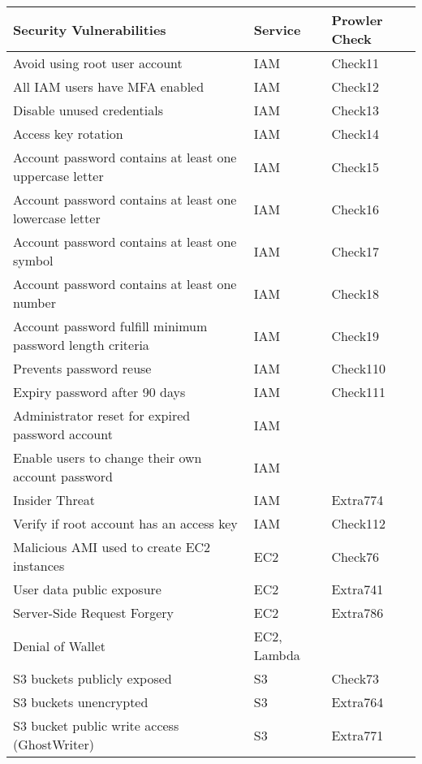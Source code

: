 \begin{longtable}{|p{10cm}|p{2.4cm}|p{2cm}|}
    \hline
    \textbf{Security Vulnerabilities} & \textbf{Service} & \textbf{Prowler Check}\\
    \hline
    Avoid using root user account & IAM & Check11 \\
    \hline
    All IAM users have MFA enabled & IAM & Check12 \\
    \hline
    Disable unused credentials & IAM & Check13 \\
    \hline
    Access key rotation & IAM & Check14 \\
    \hline
    Account password contains at least one uppercase letter & IAM & Check15 \\
    \hline
    Account password contains at least one lowercase letter & IAM & Check16 \\
    \hline
    Account password contains at least one symbol & IAM & Check17\\
    \hline
    Account password contains at least one number & IAM & Check18\\
    \hline
    Account password fulfill minimum password length criteria & IAM & Check19\\
    \hline
    Prevents password reuse & IAM & Check110\\
    \hline
    Expiry password after 90 days & IAM & Check111\\
    \hline
    Administrator reset for expired password account & IAM & \\
    \hline
    Enable users to change their own account password & IAM& \\
    \hline
    Insider Threat & IAM & Extra774\\
    \hline
    Verify if root account has an access key & IAM &
    Check112 \\
    \hline
    Malicious AMI used to create EC2 instances & EC2 & Check76\\
    \hline
    User data public exposure & EC2 & Extra741\\
    \hline
    Server-Side Request Forgery & EC2 & Extra786\\
    \hline
    Denial of Wallet & EC2, Lambda &\\
    \hline
    S3 buckets publicly exposed & S3 & Check73\\
    \hline
    S3 buckets unencrypted & S3 & Extra764\\
    \hline
    S3 bucket public write access (GhostWriter) & S3 & Extra771 \\

\end{longtable}
